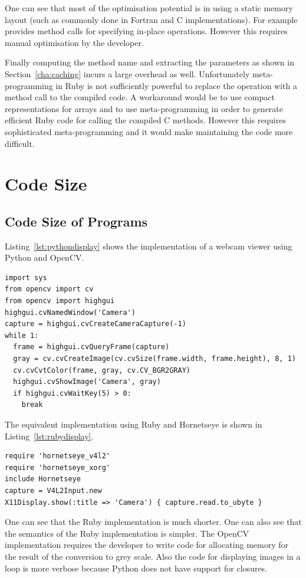 \documentclass[12pt,a4paper,oneside,openright]{book}
\newcommand{\Eg}{For ex\-am\-ple }
\newcommand{\sct}[1]{Section~\ref{cha:#1}}
\newcommand{\lst}[1]{Listing~\ref{lst:#1}}
\begin{document}
\begin{CJK}{UTF8}{}
One can see that most of the optimisation potential is in using a static memory layout (such as commonly done in Fortran and C implementations). \Eg \citet{narray3} provides method calls for specifying in-place operations. However this requires manual optimisation by the developer.

Finally computing the method name and extracting the parameters as shown in \sct{caching} incurs a large overhead as well. Unfortunately meta-programming in Ruby is not sufficiently powerful to replace the operation with a method call to the compiled code. A workaround would be to use compact representations for arrays and to use meta-programming in order to generate efficient Ruby code for calling the compiled C methods. However this requires sophisticated meta-programming and it would make maintaining the code more difficult.

\section{Code Size}\label{cha:productivity}
\subsection{Code Size of Programs}
\lst{pythondisplay} shows the implementation of a webcam viewer using Python and OpenCV.
\lstset{language=Python,frame=single,numbers=left}
\begin{lstlisting}[float,caption={Webcam viewer implemented using Python and OpenCV},escapechar=\$,label=lst:pythondisplay]
import sys
from opencv import cv
from opencv import highgui
highgui.cvNamedWindow('Camera')
capture = highgui.cvCreateCameraCapture(-1)
while 1:
  frame = highgui.cvQueryFrame(capture)
  gray = cv.cvCreateImage(cv.cvSize(frame.width, frame.height), 8, 1)
  cv.cvCvtColor(frame, gray, cv.CV_BGR2GRAY)
  highgui.cvShowImage('Camera', gray)
  if highgui.cvWaitKey(5) > 0:
    break
\end{lstlisting}
The equivalent implementation using Ruby and Hornetseye is shown in \lst{rubydisplay}.
\lstset{language=Ruby,frame=single,numbers=left}
\begin{lstlisting}[float,caption={Webcam viewer implemented using Ruby and Hornetseye},escapechar=\$,label=lst:rubydisplay]
require 'hornetseye_v4l2'
require 'hornetseye_xorg'
include Hornetseye
capture = V4L2Input.new
X11Display.show(:title => 'Camera') { capture.read.to_ubyte }
\end{lstlisting}
One can see that the Ruby implementation is much shorter. One can also see that the semantics of the Ruby implementation is simpler. The OpenCV implementation requires the developer to write code for allocating memory for the result of the conversion to grey scale. Also the code for displaying images in a loop is more verbose because Python does not have support for closures.


\end{CJK}
\end{document}
